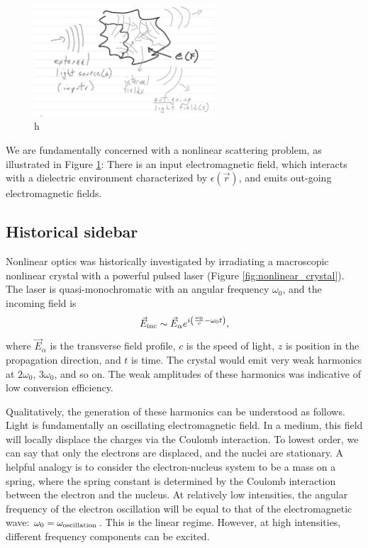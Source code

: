 \documentclass{article}
\begin{document}
\begin{figure}
    \label{fig:general_system}
    \includegraphics[width=0.6\textwidth]{figures/general_system_sketch.png}
    \centering
    \caption{h}
\end{figure}

We are fundamentally concerned with a nonlinear scattering problem, as illustrated in Figure \ref{fig:general_system}: There is an input electromagnetic field, which interacts with a dielectric environment characterized by $\epsilon(\vec{r})$, and emits out-going electromagnetic fields.

\subsection{Historical sidebar}
Nonlinear optics was historically investigated by irradiating a macroscopic nonlinear crystal with a powerful pulsed laser (Figure \ref{fig:nonlinear_crystal}). The laser is quasi-monochromatic with an angular frequency $\omega_0$, and the incoming field is 
\begin{equation}
    \vec{E}_{\rm{inc}} \sim \vec{E}_\alpha e^{i\left(\frac{\omega_0}{c}-\omega_0 t\right)},
\end{equation} 
where $\vec{E}_\alpha$ is the transverse field profile, $c$ is the speed of light, $z$ is position in the propagation direction, and $t$ is time. The crystal would emit very weak harmonics at $2\omega_0$, $3\omega_0$, and so on. The weak amplitudes of these harmonics was indicative of low conversion efficiency. 

Qualitatively, the generation of these harmonics can be understood as follows. Light is fundamentally an oscillating electromagnetic field. In a medium, this field will locally displace the charges via the Coulomb interaction. To lowest order, we can say that only the electrons are displaced, and the nuclei are stationary. A helpful analogy is to consider the electron-nucleus system to be a mass on a spring, where the spring constant is determined by the Coulomb interaction between the electron and the nucleus. At relatively low intensities, the angular frequency of the electron oscillation will be equal to that of the electromagnetic wave: $\omega_0 = \omega_{\rm{oscillation}}$. This is the linear regime. However, at high intensities, different frequency components can be excited.
\end{document}
